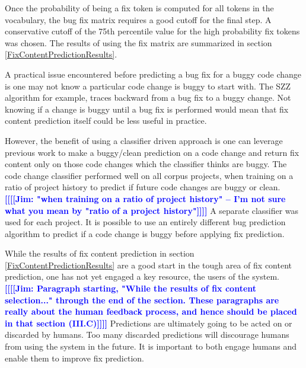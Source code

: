 \documentclass[10pt, conference, letterpaper, compsocconf]{IEEEtran}
\newcommand{\todoc}[2]{{\textcolor{#1} {\textbf{[[#2]]}}}}
\newcommand{\todoblue}[1]{\todoc{blue}{\textbf{[[#1]]}}}
\newcommand{\jim}[1]{\todoblue{Jim: #1}}
\begin{document}
Once the probability of being a fix token is computed for all tokens in the vocabulary, the bug fix matrix requires a good cutoff for the final step.
A conservative cutoff of the 75th percentile value for the high probability fix tokens was chosen. The results of using the fix matrix are summarized in section \ref{FixContentPredictionResults}.

A practical issue encountered before predicting a bug fix for a buggy code change is one may not know a particular code change is buggy to start with.
The SZZ algorithm for example, traces backward from a bug fix to a buggy change.
Not knowing if a change is buggy until a bug fix is performed would mean that fix content prediction itself could be less useful in practice.

However, the benefit of using a classifier driven approach is one can leverage previous work to make a buggy/clean prediction on a code change and return fix content
 only on those code changes which the classifier thinks are buggy.
The code change classifier performed well on all corpus projects, when training on a ratio of project history to predict if future code changes are buggy or clean. \jim{"when training on a ratio of project history" -- I'm not sure what you mean by "ratio of a project history"}
A separate classifier was used for each project.
It is possible to use an entirely different bug prediction algorithm to predict if a code change is buggy before applying fix prediction.

While the results of fix content prediction in section \ref{FixContentPredictionResults} are a good start in the tough area of fix content prediction, one has not yet engaged a key resource,
the users of the system. \jim{Paragraph starting, "While the results of fix content selection..." through the end of the section. These paragraphs are really about the human feedback process, and hence should be placed in that section (III.C)}
Predictions are ultimately going to be acted on or discarded by humans.
Too many discarded predictions will discourage humans from using the system in the future.
It is important to both engage humans and enable them to improve fix prediction.
\end{document}
